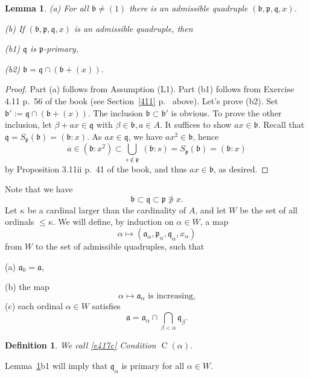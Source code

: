 \documentclass[parskip=half,fontsize=12pt]{scrartcl}%
\newcommand{\oo}{\operatorname}\newcommand{\ooo}{\operatorname*}
\newcommand{\mf}{\mathfrak}
\newcommand{\aaa}{\mf a}
\newcommand{\bbb}{\mf b}
\newcommand{\ppp}{\mf p}
\newcommand{\qqq}{\mf q}
\newtheorem{df}[thm]{Definition}
\newtheorem{lem}[thm]{Lemma}
\begin{document}
\begin{lem}\label{l417}
 \emph{(a)} For all $\bbb\ne(1)$ there is an admissible quadruple $(\bbb,\ppp,\qqq,x)$.

\emph{(b)} If $(\bbb,\ppp,\qqq,x)$ is an admissible quadruple, then 

\emph{(b1)} $\mathfrak q$ is $\mathfrak p$-primary, 

\emph{(b2)} $\bbb=\mathfrak q\cap(\bbb+(x))$.
\end{lem}

\begin{proof}
Part (a) follows from Assumption (L1). Part (b1) follows from Exercise 4.11 p.~56 of the book (see Section~\ref{411} p.~\pageref{411} above). Let's prove (b2). Set $\bbb':=\mathfrak q\cap(\bbb+(x))$. The inclusion $\bbb\subset\bbb'$ is obvious. To prove the other inclusion, let $\beta+ax\in\qqq$ with $\beta\in\bbb,a\in A$. It suffices to show $ax\in\bbb$. Recall that $\qqq=S_{\ppp}(\bbb)=(\bbb:x)$. As $ax\in\qqq$, we have $ax^2\in\bbb$, hence 
$$
a\in(\bbb:x^2)\subset\bigcup_{s\notin\ppp}\ (\bbb:s)=S_{\ppp}(\bbb)=(\bbb:x)
$$ 
by Proposition 3.11ii p.~41 of the book, and thus $ax\in\bbb$, as desired. 
\end{proof}

Note that we have 
$$
\bbb\subset\qqq\subset\ppp\not\ni x.
$$
Let $\kappa$ be a cardinal larger than the cardinality of $A$, and let $W$ be the set of all ordinals $\le\kappa$. We will define, by induction on $\alpha\in W$, a map 
\begin{equation}\label{e417a}
\alpha\mapsto(\aaa_\alpha,\ppp_\alpha,\qqq_\alpha,x_\alpha)
\end{equation}
from $W$ to the set of admissible quadruples, such that 

(a) $\aaa_0=\aaa$, 

(b) the map 
\begin{equation}\label{e417b}
\alpha\mapsto\aaa_\alpha\text{ is increasing,}
\end{equation} 
(c) each ordinal $\alpha\in W$ satisfies 
\begin{equation}\label{e417c}
\aaa=\aaa_\alpha\cap\bigcap_{\beta<\alpha}\qqq_\beta.
\end{equation}
\begin{df}\label{calpha}
We call \eqref{e417c} Condition $\oo C(\alpha)$. 
\end{df}

Lemma~\ref{l417}b1 will imply that $\qqq_\alpha$ is primary for all $\alpha\in W$. 
\end{document}
